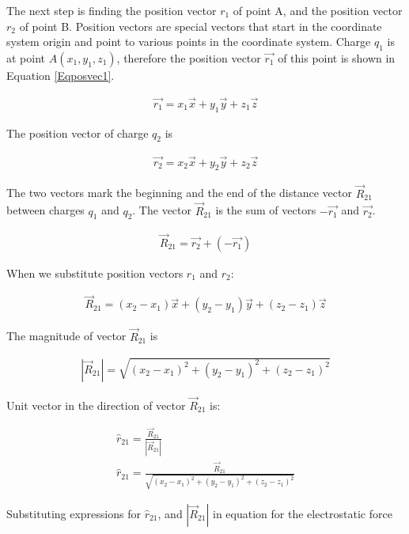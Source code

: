 \documentclass{ximera}
\begin{document}
\begin{example}
\begin{explanation}
The next step is finding the position vector $r_1$ of point A, and the position vector $r_2$ of point B. Position vectors are special vectors that start in the coordinate system origin and point to various points in the coordinate system. Charge $q_1$ is at point $A(x_1,y_1,z_1)$, therefore the position vector $\vec{r_1}$ of this point is  shown in Equation \ref{Eqposvec1}.


\begin{eqnarray}
\vec{r_1}=x_1 \vec{x} + y_1 \vec{y} +z_1 \vec{z} \label{Eqposvec1}
\end{eqnarray}

The position vector of charge $q_2$ is 

\begin{eqnarray}
\vec{r_2}=x_2\vec{x} + y_2 \vec{y} +z_2 \vec{z}
\end{eqnarray}

The two vectors mark the beginning and the end of the distance vector $\vec{R}_{21}$  between charges $q_1$ and $q_2$. The vector  $\vec{R}_{21}$ is the sum of vectors $-\vec{r_1}$ and $\vec{r_2}$. 



\begin{eqnarray}
\vec{R}_{21}=\vec{r_2} + (-\vec{r_1})
\end{eqnarray}

When we substitute position vectors $r_1$ and $r_2$:

\begin{eqnarray}
\vec{R}_{21}= (x_2 - x_1) \vec{x} +(y_2 - y_1) \vec{y} +(z_2 - z_1) \vec{z}
\end{eqnarray}

The magnitude of vector $\vec{R}_{21}$ is


\begin{eqnarray}
|\vec{R}_{21}|= \sqrt{(x_2 - x_1)^2 +(y_2 - y_1)^2 +(z_2 - z_1)^2}
\end{eqnarray}

Unit vector in the direction of vector $\vec{R}_{21}$ is:


\begin{eqnarray}
\hat{r}_{21}= \frac{\vec{R}_{21}}{|\vec{R}_{21}|} \\
\hat{r}_{21}=\frac{\vec{R}_{21}}{\sqrt{(x_2 - x_1)^2 +(y_2 - y_1)^2 +(z_2 - z_1)^2}}
\end{eqnarray}

Substituting expressions for $\hat{r}_{21}$, and $|\vec{R}_{21}|$ in equation for the electrostatic force 


\end{explanation}
\end{example}
\end{document}
